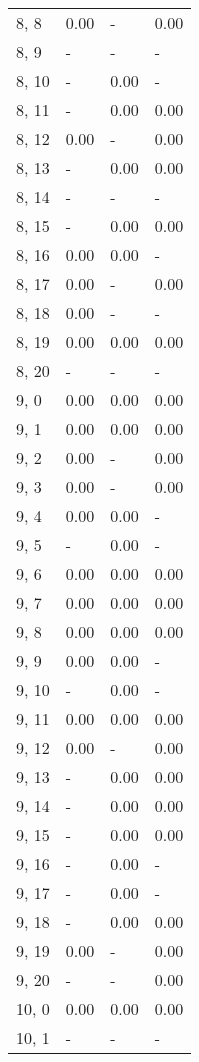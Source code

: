 \begin{table}
\begin{tabular}{llll}
8, 8   &  0.00 &     - &  0.00 \\
8, 9   &     - &     - &     - \\
8, 10  &     - &  0.00 &     - \\
8, 11  &     - &  0.00 &  0.00 \\
8, 12  &  0.00 &     - &  0.00 \\
8, 13  &     - &  0.00 &  0.00 \\
8, 14  &     - &     - &     - \\
8, 15  &     - &  0.00 &  0.00 \\
8, 16  &  0.00 &  0.00 &     - \\
8, 17  &  0.00 &     - &  0.00 \\
8, 18  &  0.00 &     - &     - \\
8, 19  &  0.00 &  0.00 &  0.00 \\
8, 20  &     - &     - &     - \\
9, 0   &  0.00 &  0.00 &  0.00 \\
9, 1   &  0.00 &  0.00 &  0.00 \\
9, 2   &  0.00 &     - &  0.00 \\
9, 3   &  0.00 &     - &  0.00 \\
9, 4   &  0.00 &  0.00 &     - \\
9, 5   &     - &  0.00 &     - \\
9, 6   &  0.00 &  0.00 &  0.00 \\
9, 7   &  0.00 &  0.00 &  0.00 \\
9, 8   &  0.00 &  0.00 &  0.00 \\
9, 9   &  0.00 &  0.00 &     - \\
9, 10  &     - &  0.00 &     - \\
9, 11  &  0.00 &  0.00 &  0.00 \\
9, 12  &  0.00 &     - &  0.00 \\
9, 13  &     - &  0.00 &  0.00 \\
9, 14  &     - &  0.00 &  0.00 \\
9, 15  &     - &  0.00 &  0.00 \\
9, 16  &     - &  0.00 &     - \\
9, 17  &     - &  0.00 &     - \\
9, 18  &     - &  0.00 &  0.00 \\
9, 19  &  0.00 &     - &  0.00 \\
9, 20  &     - &     - &  0.00 \\
10, 0  &  0.00 &  0.00 &  0.00 \\
10, 1  &     - &     - &     - \\

\end{tabular}
\end{table}
